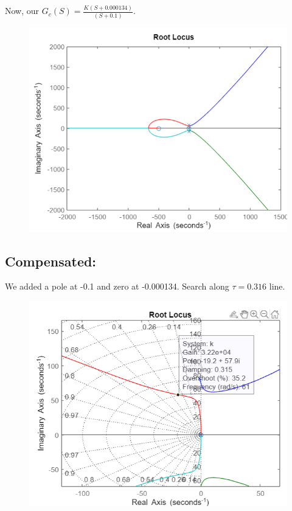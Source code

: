 \documentclass[12pt]{article}
\begin{document}
Now, our \(G_c(S) = \frac{K(S + 0.000134)}{(S + 0.1)}\). \par

\begin{figure}[H]
  \centering
  \includegraphics[width=0.8\linewidth]{images/before_plot6.png}
  \label{fig:plot_before_6}
\end{figure}

\subsection*{Compensated:}
We added a pole at -0.1 and zero at -0.000134. Search along \(\tau = 0.316\) line. \par

\begin{figure}[H]
  \centering
  \includegraphics[width=0.8\linewidth]{images/plot6.png}
  \label{fig:plot_6}
\end{figure}
\end{document}
